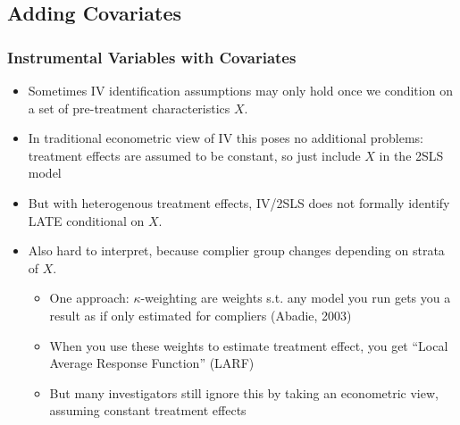 \documentclass[xcolor=dvipsnames]{beamer}
\begin{document}

\subsection{Adding Covariates}

\begin{frame}
  \frametitle{Instrumental Variables with Covariates}
\begin{itemize}
\item<1-> Sometimes IV identification assumptions may only hold once we condition on a set of pre-treatment characteristics $X$. %
\medskip
\item<2-> In traditional econometric view of IV this poses no additional problems: treatment effects are assumed to be constant, so  just include $X$ in the 2SLS model\medskip
\item<3-> But with heterogenous treatment effects, IV/2SLS does not formally identify LATE conditional on $X$. 
\medskip
\item<4-> Also hard to interpret, because complier group changes depending on strata of $X$.
\begin{itemize}
\item<5-> One approach: $\kappa$-weighting are weights s.t. any model you run gets you a result as if only estimated for compliers (Abadie, 2003)
\item<6-> When you use these weights to estimate treatment effect, you get ``Local Average Response Function'' (LARF)
\item<7-> But many investigators still ignore this by taking an econometric view, assuming constant treatment effects
\end{itemize}
\end{itemize}
\end{frame}
\end{document}
